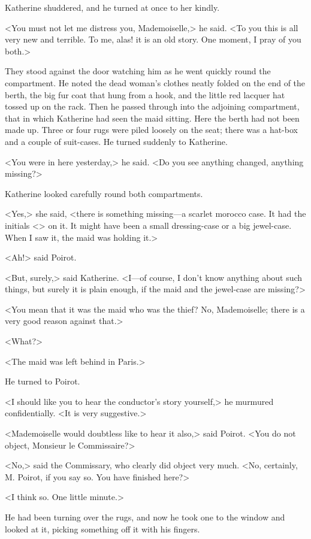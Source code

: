 Katherine shuddered, and he turned at once to her kindly.

<You must not let me distress you, Mademoiselle,> he said. <To you this is all very new and terrible. To me, alas! it is an old story. One moment, I pray of you both.>

They stood against the door watching him as he went quickly round the compartment. He noted the dead woman's clothes neatly folded on the end of the berth, the big fur coat that hung from a hook, and the little red lacquer hat tossed up on the rack. Then he passed through into the adjoining compartment, that in which Katherine had seen the maid sitting. Here the berth had not been made up. Three or four rugs were piled loosely on the seat; there was a hat-box and a couple of suit-cases. He turned suddenly to Katherine.

<You were in here yesterday,> he said. <Do you see anything changed, anything missing?>

Katherine looked carefully round both compartments.

<Yes,> she said, <there is something missing—a scarlet morocco case. It had the initials <> on it. It might have been a small dressing-case or a big jewel-case. When I saw it, the maid was holding it.>

<Ah!> said Poirot.

<But, surely,> said Katherine. <I—of course, I don't know anything about such things, but surely it is plain enough, if the maid and the jewel-case are missing?>

<You mean that it was the maid who was the thief? No, Mademoiselle; there is a very good reason against that.>

<What?>

<The maid was left behind in Paris.>

He turned to Poirot.

<I should like you to hear the conductor's story yourself,> he murmured confidentially. <It is very suggestive.>

<Mademoiselle would doubtless like to hear it also,> said Poirot. <You do not object, Monsieur le Commissaire?>

<No,> said the Commissary, who clearly did object very much. <No, certainly, M. Poirot, if you say so. You have finished here?>

<I think so. One little minute.>

He had been turning over the rugs, and now he took one to the window and looked at it, picking something off it with his fingers.

